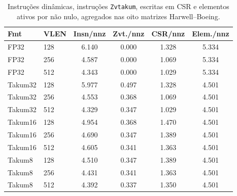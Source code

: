 \begin{table}[t]
\caption{Instru\c{c}\~oes din\^amicas, instru\c{c}\~oes \texttt{Zvtakum}, escritas em CSR e elementos ativos por n\~ao nulo, agregados nas oito matrizes Harwell--Boeing.}
\label{tab:contagens}
\centering
\scriptsize
\setlength{\tabcolsep}{3.0pt}
\renewcommand{\arraystretch}{0.95}
\begin{tabular}{@{}llcccc@{}}
\toprule
Fmt & VLEN & Insn/nnz & Zvt./nnz & CSR/nnz & Elem./nnz \\
\midrule
FP32 & 128 & 6.140 & 0.000 & 1.328 & 5.334 \\
FP32 & 256 & 4.587 & 0.000 & 1.069 & 5.334 \\
FP32 & 512 & 4.343 & 0.000 & 1.029 & 5.334 \\
\midrule
Takum32 & 128 & 5.977 & 0.497 & 1.328 & 4.501 \\
Takum32 & 256 & 4.553 & 0.368 & 1.069 & 4.501 \\
Takum32 & 512 & 4.329 & 0.347 & 1.029 & 4.501 \\
\midrule
Takum16 & 128 & 4.954 & 0.368 & 1.470 & 4.501 \\
Takum16 & 256 & 4.690 & 0.347 & 1.389 & 4.501 \\
Takum16 & 512 & 4.605 & 0.341 & 1.363 & 4.501 \\
\midrule
Takum8 & 128 & 4.510 & 0.347 & 1.389 & 4.501 \\
Takum8 & 256 & 4.431 & 0.341 & 1.363 & 4.501 \\
Takum8 & 512 & 4.392 & 0.337 & 1.350 & 4.501 \\
\bottomrule
\end{tabular}
\end{table}
